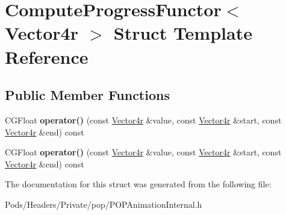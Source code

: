 \hypertarget{struct_compute_progress_functor_3_01_vector4r_01_4}{}\section{Compute\+Progress\+Functor$<$ Vector4r $>$ Struct Template Reference}
\label{struct_compute_progress_functor_3_01_vector4r_01_4}
\subsection*{Public Member Functions}
\begin{DoxyCompactItemize}
\item 
\mbox{\label{struct_compute_progress_functor_3_01_vector4r_01_4_af5852a132395cc5f9f62f0a94519819f}} 
C\+G\+Float {\bfseries operator()} (const \mbox{\hyperlink{struct_p_o_p_1_1_vector4}{Vector4r}} \&value, const \mbox{\hyperlink{struct_p_o_p_1_1_vector4}{Vector4r}} \&start, const \mbox{\hyperlink{struct_p_o_p_1_1_vector4}{Vector4r}} \&end) const
\item 
\mbox{\label{struct_compute_progress_functor_3_01_vector4r_01_4_af5852a132395cc5f9f62f0a94519819f}} 
C\+G\+Float {\bfseries operator()} (const \mbox{\hyperlink{struct_p_o_p_1_1_vector4}{Vector4r}} \&value, const \mbox{\hyperlink{struct_p_o_p_1_1_vector4}{Vector4r}} \&start, const \mbox{\hyperlink{struct_p_o_p_1_1_vector4}{Vector4r}} \&end) const
\end{DoxyCompactItemize}


The documentation for this struct was generated from the following file\+:\begin{DoxyCompactItemize}
\item 
Pods/\+Headers/\+Private/pop/P\+O\+P\+Animation\+Internal.\+h\end{DoxyCompactItemize}
